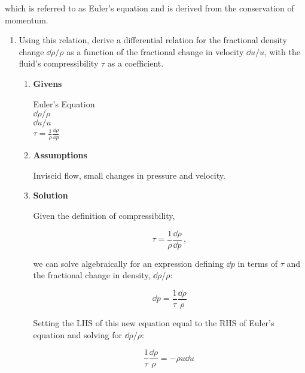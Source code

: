 \documentclass[12pt,letterpaper]{article}
\begin{document}
	which is referred to as Euler’s equation and is derived from the conservation of momentum.
	
	\begin{enumerate}[label=(\alph*)]
		\item Using this relation, derive a differential relation for the fractional density change $\dd \rho / \rho$ as a function of the fractional change in velocity $\dd u/ u$, with the fluid's compressibility $\tau$ as a coefficient.
		
		\medskip
		
		\begin{enumerate}[label=\arabic*.]
			
			\item{\textbf{Givens}} \\
				Euler's Equation\\
				$\dd \rho / \rho $ \\
				$\dd u / u$ \\
				$\tau = \frac{1}{\rho} \frac{\dd \rho}{\dd p}$
			
			\item{\textbf{Assumptions}} \\
				Inviscid flow, small changes in pressure and velocity.\\
			
			
			\item{\textbf{Solution}} \\
				Given the definition of compressibility,
			
			
			\begin{equation*}
				\tau = \frac{1}{\rho} \frac{\dd \rho}{\dd p} \,,
			\end{equation*}
			
			we can solve algebraically for an expression defining $\dd p$ in terms of $\tau$ and the fractional change in density, $\dd \rho / \rho$:
			
			\begin{equation*}
				\dd p = \frac{1}{\tau} \frac{\dd \rho}{\rho}
			\end{equation*}
		
			Setting the LHS of this new equation equal to the RHS of Euler's equation and solving for $\dd \rho / \rho$:
			
			\begin{equation*}
				\frac{1}{\tau} \frac{\dd \rho}{\rho} = - \rho u\dd u\
			\end{equation*}
			

\end{enumerate}
\end{enumerate}
\end{document}
